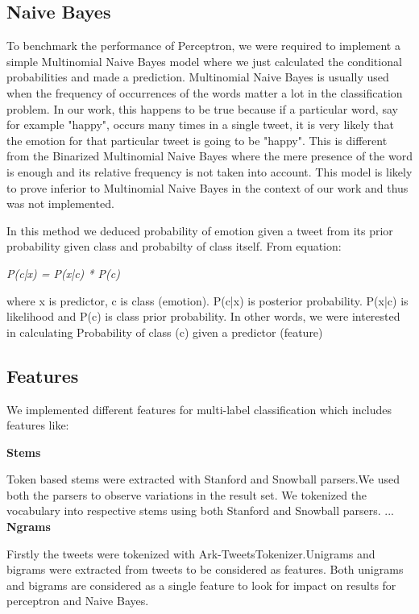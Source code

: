 \documentclass[11pt]{article}
\begin{document}
{  \subsection{Naive Bayes}
   To benchmark the performance of Perceptron, we were required to implement a simple Multinomial Naive Bayes model where we just calculated the conditional probabilities and made a prediction. Multinomial Naive Bayes is usually used when the frequency of occurrences of the words matter a lot in the classification problem. In our work, this happens to be true because if a particular word, say for example "happy", occurs many times in a single tweet, it is very likely that the emotion for that particular tweet is going to be "happy". This is different from the Binarized Multinomial Naive Bayes where the mere presence of the word is enough and its relative frequency is not taken into account. This model is likely to prove inferior to Multinomial Naive Bayes in the context of our work and thus was not implemented.
  
  
  In this method we deduced probability of emotion given a tweet from its prior probability given class and probabilty of class itself. From equation:
  
  \textit{ P(c|x) = P(x|c) * P(c)}
  
  
  where x is predictor, c is class (emotion). P(c|x) is posterior probability. P(x|c) is likelihood and P(c) is class prior probability. In other words, we were interested in calculating Probability of class (c) given a predictor (feature)
  
  \subsection{Features}
  
  We implemented different features for multi-label classification which includes features like:
  
  

  
  
  {\bf Stems}
  
  
  Token based stems were extracted with Stanford and Snowball parsers.We used both the parsers to observe variations in the result set. We tokenized the vocabulary into respective stems using both Stanford and Snowball parsers.
  ...\\
  
  
  {\bf Ngrams}
  
  Firstly the tweets were tokenized with Ark-TweetsTokenizer.Unigrams and bigrams were extracted from tweets to be considered as features. Both unigrams and bigrams are considered as a single feature to look for impact on results for perceptron and Naive Bayes.
  
}
\end{document}
